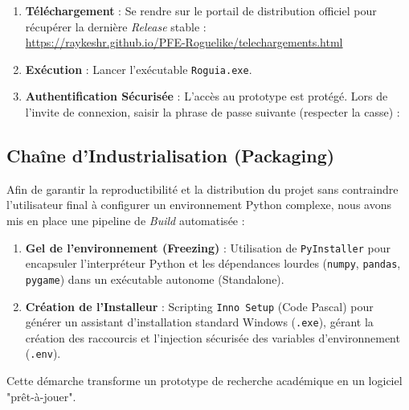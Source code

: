 \documentclass[12pt,a4paper]{article}
\begin{document}
\begin{enumerate}
    \item \textbf{Téléchargement} : Se rendre sur le portail de distribution officiel pour récupérer la dernière \textit{Release} stable : \\
    \url{https://raykeshr.github.io/PFE-Roguelike/telechargements.html}
    
    \item \textbf{Exécution} : Lancer l'exécutable \texttt{Roguia.exe}.
    
    \item \textbf{Authentification Sécurisée} : 
    L'accès au prototype est protégé. Lors de l'invite de connexion, saisir la phrase de passe suivante (respecter la casse) :
    
    \begin{center}
    \end{center}
\end{enumerate}

\subsection{Chaîne d'Industrialisation (Packaging)}
Afin de garantir la reproductibilité et la distribution du projet sans contraindre l'utilisateur final à configurer un environnement Python complexe, nous avons mis en place une pipeline de \textit{Build} automatisée :

\begin{enumerate}
    \item \textbf{Gel de l'environnement (Freezing)} : Utilisation de \texttt{PyInstaller} pour encapsuler l'interpréteur Python et les dépendances lourdes (\texttt{numpy}, \texttt{pandas}, \texttt{pygame}) dans un exécutable autonome (Standalone).
    \item \textbf{Création de l'Installeur} : Scripting \texttt{Inno Setup} (Code Pascal) pour générer un assistant d'installation standard Windows (\texttt{.exe}), gérant la création des raccourcis et l'injection sécurisée des variables d'environnement (\texttt{.env}).
\end{enumerate}

Cette démarche transforme un prototype de recherche académique en un logiciel "prêt-à-jouer".
\end{document}
